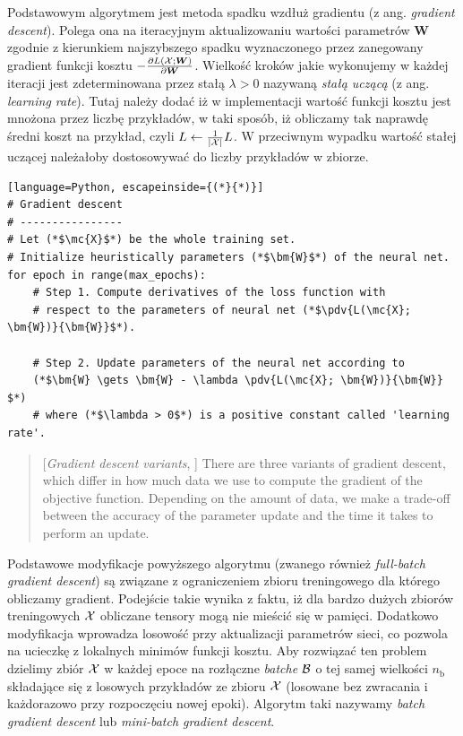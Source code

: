 \documentclass{myclass}
\numberwithin{equation}{subsection}
\begin{document}
Podstawowym algorytmem jest metoda spadku wzdłuż gradientu (z ang. \textit{gradient descent}).
Polega ona na iteracyjnym aktualizowaniu wartości parametrów \(\bm{W}\) zgodnie z kierunkiem
najszybszego spadku wyznaczonego przez zanegowany gradient funkcji kosztu \(-\pdv{L(\mathcal{X};
\bm{W})}{\bm{W}}\). Wielkość kroków jakie wykonujemy w każdej iteracji jest zdeterminowana przez
stałą \(\lambda > 0\) nazywaną \emph{stałą uczącą} (z ang. \textit{learning rate}). Tutaj należy
dodać iż w implementacji wartość funkcji kosztu jest mnożona przez liczbę przykładów, w taki sposób,
iż obliczamy tak naprawdę średni koszt na przykład, czyli \(L \gets \frac{1}{|\mathcal{X}|}L\). W
przeciwnym wypadku wartość stałej uczącej należałoby dostosowywać do liczby przykładów w zbiorze.

\begin{lstlisting}[language=Python, escapeinside={(*}{*)}]
# Gradient descent
# ----------------
# Let (*$\mc{X}$*) be the whole training set.
# Initialize heuristically parameters (*$\bm{W}$*) of the neural net.
for epoch in range(max_epochs):
    # Step 1. Compute derivatives of the loss function with
    # respect to the parameters of neural net (*$\pdv{L(\mc{X}; \bm{W})}{\bm{W}}$*).

    # Step 2. Update parameters of the neural net according to
    (*$\bm{W} \gets \bm{W} - \lambda \pdv{L(\mc{X}; \bm{W})}{\bm{W}} $*)
    # where (*$\lambda > 0$*) is a positive constant called 'learning rate'.
\end{lstlisting}

\begin{quote}[\textit{Gradient descent variants}, \cite{ruder2017overviewgradientdescentoptimization}]
There are three variants of gradient descent, which differ in how much data we use to compute the
gradient of the objective function. Depending on the amount of data, we make a trade-off between the
accuracy of the parameter update and the time it takes to perform an update.
\end{quote}

Podstawowe modyfikacje powyższego algorytmu (zwanego również \textit{full-batch gradient descent})
są związane z ograniczeniem zbioru treningowego dla którego obliczamy gradient. Podejście takie
wynika z faktu, iż dla bardzo dużych zbiorów treningowych \(\mathcal{X}\) obliczane tensory mogą nie
mieścić się w pamięci. Dodatkowo modyfikacja wprowadza losowość przy aktualizacji parametrów sieci,
co pozwola na ucieczkę z lokalnych minimów funkcji kosztu. Aby rozwiązać ten problem dzielimy zbiór
\(\mathcal{X}\) w każdej epoce na rozłączne \textit{batche} \(\mathcal{B}\) o tej samej wielkości
\(n_\text{b}\) składające się z losowych przykładów ze zbioru \(\mathcal{X}\) (losowane bez zwracania i
każdorazowo przy rozpoczęciu nowej epoki). Algorytm taki nazywamy \textit{batch gradient descent}
lub \textit{mini-batch gradient descent}.
\end{document}
